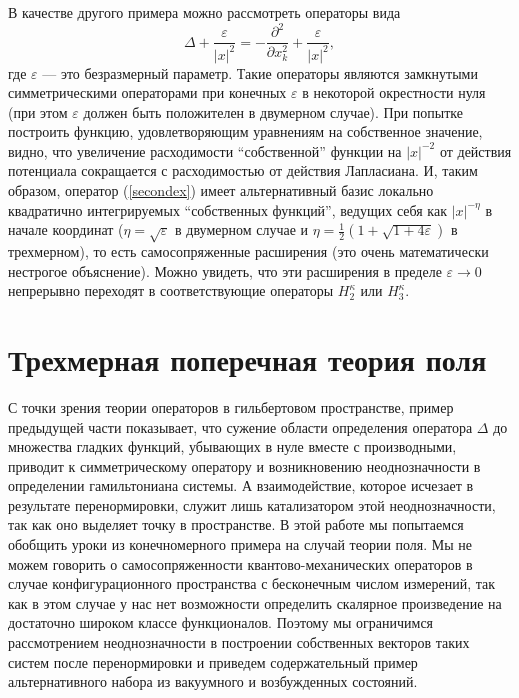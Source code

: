 \documentclass[12pt]{article}
\newcommand{\ve}{\varepsilon}
\begin{document}
    В качестве другого примера можно рассмотреть операторы вида
\begin{equation}
\label{secondex}
    \Delta + \frac{\ve}{|x|^{2}} =
	-\frac{\partial^{2}}{\partial x_{k}^{2}} + \frac{\ve}{|x|^{2}},
\end{equation}
    где
$ \ve $ --- это безразмерный параметр.
    Такие операторы являются замкнутыми симметрическими операторами
    при конечных
$ \ve $
    в некоторой окрестности нуля (при этом
$ \ve $ должен быть положителен в двумерном случае).
    При попытке построить функцию, удовлетворяющим уравнениям на собственное
    значение, видно, что увеличение расходимости ``собственной'' функции на
$ |x|^{-2} $
    от действия потенциала сокращается с расходимостью от действия
    Лапласиана.
    И, таким образом, оператор
(\ref{secondex})
    имеет альтернативный базис локально квадратично интегрируемых
    ``собственных функций'', ведущих себя как
$ |x|^{-\eta} $
    в начале координат
($ \eta = \sqrt{\ve} $ в двумерном случае и 
$ \eta = \frac{1}{2}(1+\sqrt{1+4\ve}) $ в трехмерном),
    то есть самосопряженные расширения
    (это очень математически нестрогое объяснение).
    Можно увидеть, что эти расширения в пределе
$ \ve \to 0 $
    непрерывно переходят в соответствующие операторы
$ H_{2}^{\kappa} $ или
$ H_{3}^{\kappa} $.

\section{Трехмерная поперечная теория поля}
    С точки зрения теории операторов в гильбертовом пространстве, пример
    предыдущей части показывает,
    что сужение области определения оператора
$ \Delta $
    до множества гладких функций, убывающих в нуле вместе с производными,
    приводит к симметрическому оператору и возникновению неоднозначности в
    определении гамильтониана системы.
    А взаимодействие, которое исчезает в результате перенормировки,
    служит лишь катализатором этой неоднозначности, так как оно выделяет
    точку в пространстве.
    В этой работе мы попытаемся обобщить уроки из конечномерного примера
    на случай теории поля.
    Мы не можем говорить о самосопряженности квантово-механических
    операторов в случае конфигурационного пространства с бесконечным
    числом измерений, так как в этом случае
    у нас нет возможности определить скалярное произведение на достаточно
    широком классе функционалов.
    Поэтому мы ограничимся рассмотрением
    неоднозначности в построении собственных векторов таких систем
    после перенормировки и приведем содержательный пример альтернативного
    набора из вакуумного и возбужденных состояний.
\end{document}
